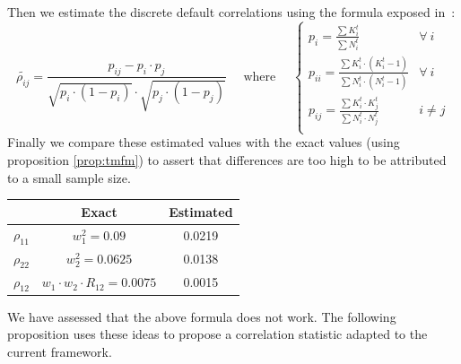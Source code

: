 \documentclass[11pt,fleqn]{book} %
\begin{document}
Then we estimate the discrete default correlations using the formula exposed 
in~\cite{nagpal:2001}:
\begin{displaymath}
	\widetilde{\rho_{ij}} = \frac{p_{ij} - p_i \cdot p_j}{\sqrt{p_i \cdot (1-p_i)} \cdot \sqrt{p_j \cdot (1-p_j)}}
	\quad \text{ where } \quad
	\left\{
		\begin{array}{ll}
			p_i = \frac{\sum K_i^t}{\sum N_i^t} & \forall\ i \\
			p_{ii} = \frac{\sum K_i^t \cdot (K_i^t-1)}{\sum N_i^t \cdot (N_i^t-1)} & \forall\ i \\
			p_{ij} = \frac{\sum K_i^t \cdot K_j^t}{\sum N_i^t \cdot N_j^t} & i \ne j \\
		\end{array}
	\right.
\end{displaymath}
Finally we compare these estimated values with the exact values
(using proposition \ref{prop:tmfm}) to assert that differences are too 
high to be attributed to a small sample size.

\hspace*{1cm}
\begin{tabular}{c|c|c|}
	\cline{2-3}
	& Exact & Estimated \\
	\hline
	\multicolumn{1}{|c|}{$\rho_{11}$} & $w_1^2 = 0.09$ & 0.0219 \\
	\hline
	\multicolumn{1}{|c|}{$\rho_{22}$} & $w_2^2 = 0.0625$ & 0.0138 \\
	\hline
	\multicolumn{1}{|c|}{$\rho_{12}$} & $w_1 \cdot w_2 \cdot R_{12} = 0.0075$ & 0.0015 \\
	\hline
\end{tabular}

We have assessed that the above formula does not work. The following 
proposition uses these ideas to propose a correlation statistic adapted to
the current framework.
\end{document}

